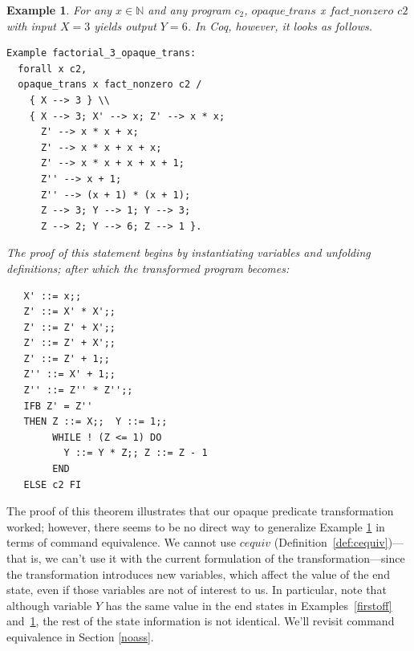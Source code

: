 \documentclass[compsoc,conference,a4paper,10pt,times]{IEEEtran}
\newtheorem{example}[theorem]{Example}
\begin{document}
\begin{example}\label{firstfact}
    For any $x\in \mathbb{N}$ and any program $c_2$, $opaque\_trans$ x $fact\_nonzero$ $c2$ with input $X=3$ yields output $Y=6$.  In Coq, however, it looks as follows.
\begin{verbatim}
Example factorial_3_opaque_trans:
  forall x c2, 
  opaque_trans x fact_nonzero c2 /
    { X --> 3 } \\
    { X --> 3; X' --> x; Z' --> x * x; 
      Z' --> x * x + x; 
      Z' --> x * x + x + x;
      Z' --> x * x + x + x + 1; 
      Z'' --> x + 1; 
      Z'' --> (x + 1) * (x + 1); 
      Z --> 3; Y --> 1; Y --> 3; 
      Z --> 2; Y --> 6; Z --> 1 }.
\end{verbatim}

The proof of this statement begins by instantiating variables and unfolding definitions; after which the transformed program becomes: 
\begin{verbatim}
   X' ::= x;;
   Z' ::= X' * X';;
   Z' ::= Z' + X';;
   Z' ::= Z' + X';;
   Z' ::= Z' + 1;;
   Z'' ::= X' + 1;;
   Z'' ::= Z'' * Z'';;
   IFB Z' = Z'' 
   THEN Z ::= X;;  Y ::= 1;;
        WHILE ! (Z <= 1) DO
          Y ::= Y * Z;; Z ::= Z - 1 
        END
   ELSE c2 FI
\end{verbatim}
\end{example}

The proof of this theorem illustrates that our opaque predicate transformation worked; however, there seems to be no direct way to generalize Example \ref{firstfact} in terms of command equivalence. We cannot use $cequiv$ (Definition~\ref{def:cequiv})---that is, we can't use it with the current formulation of the transformation---since the transformation introduces new variables, which affect the value of the end state, even if those variables are not of interest to us. In particular, note that although variable $Y$ has the same value in the end states in Examples~\ref{firstoff} and~\ref{firstfact}, the rest of the state information is not identical. We'll revisit command equivalence in Section \ref{noass}.
      
\end{document}
